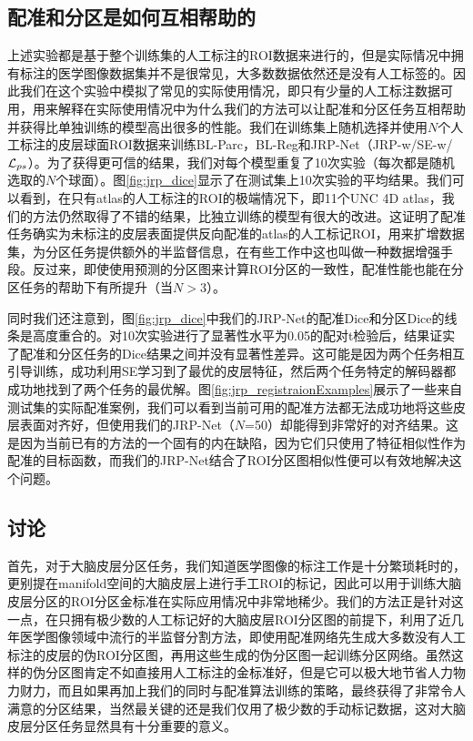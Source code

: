 \subsection{配准和分区是如何互相帮助的}
上述实验都是基于整个训练集的人工标注的ROI数据来进行的，但是实际情况中拥有标注的医学图像数据集并不是很常见，大多数数据依然还是没有人工标签的。因此我们在这个实验中模拟了常见的实际使用情况，即只有少量的人工标注数据可用，用来解释在实际使用情况中为什么我们的方法可以让配准和分区任务互相帮助并获得比单独训练的模型高出很多的性能。我们在训练集上随机选择并使用$N$个人工标注的皮层球面ROI数据来训练BL-Parc，BL-Reg和JRP-Net（JRP-w/SE-w/${\cal L}_{ps}$）。为了获得更可信的结果，我们对每个模型重复了10次实验（每次都是随机选取的$N$个球面）。图\ref{fig:jrp_dice}显示了在测试集上10次实验的平均结果。我们可以看到，在只有atlas的人工标注的ROI的极端情况下，即11个UNC 4D atlas\cite{li2015construction}，我们的方法仍然取得了不错的结果，比独立训练的模型有很大的改进。这证明了配准任务确实为未标注的皮层表面提供反向配准的atlas的人工标记ROI，用来扩增数据集，为分区任务提供额外的半监督信息，在有些工作\cite{xu2019deepatlas}中这也叫做一种数据增强手段。反过来，即使使用预测的分区图来计算ROI分区的一致性，配准性能也能在分区任务的帮助下有所提升（当$N>3$）。

同时我们还注意到，图\ref{fig:jrp_dice}中我们的JRP-Net的配准Dice和分区Dice的线条是高度重合的。对10次实验进行了显著性水平为0.05的配对t检验后，结果证实了配准和分区任务的Dice结果之间并没有显著性差异。这可能是因为两个任务相互引导训练，成功利用SE学习到了最优的皮层特征，然后两个任务特定的解码器都成功地找到了两个任务的最优解。图\ref{fig:jrp_registraionExamples}展示了一些来自测试集的实际配准案例，我们可以看到当前可用的配准方法都无法成功地将这些皮层表面对齐好，但使用我们的JRP-Net（$N$=50）却能得到非常好的对齐结果。这是因为当前已有的方法的一个固有的内在缺陷，因为它们只使用了特征相似性作为配准的目标函数，而我们的JRP-Net结合了ROI分区图相似性便可以有效地解决这个问题。

\subsection{讨论}
首先，对于大脑皮层分区任务，我们知道医学图像的标注工作是十分繁琐耗时的，更别提在manifold空间的大脑皮层上进行手工ROI的标记，因此可以用于训练大脑皮层分区的ROI分区金标准在实际应用情况中非常地稀少。我们的方法正是针对这一点，在只拥有极少数的人工标记好的大脑皮层ROI分区图的前提下，利用了近几年医学图像领域中流行的半监督分割方法，即使用配准网络先生成大多数没有人工标注的皮层的伪ROI分区图，再用这些生成的伪分区图一起训练分区网络。虽然这样的伪分区图肯定不如直接用人工标注的金标准好，但是它可以极大地节省人力物力财力，而且如果再加上我们的同时与配准算法训练的策略，最终获得了非常令人满意的分区结果，当然最关键的还是我们仅用了极少数的手动标记数据，这对大脑皮层分区任务显然具有十分重要的意义。

